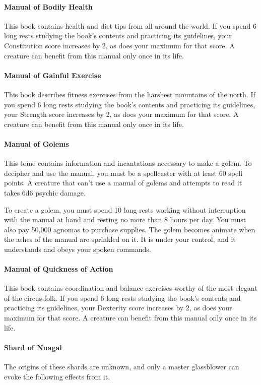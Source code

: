     \paragraph{Manual of Bodily Health}
        This book contains health and diet tips from all around the world.
        If you spend 6 long rests studying the book's contents and practicing its guidelines, your Constitution score increases by 2, as does your maximum for that score.
        A creature can benefit from this manual only once in its life.
    \paragraph{Manual of Gainful Exercise}
        This book describes fitness exercises from the harshest mountains of the north.
        If you spend 6 long rests studying the book's contents and practicing its guidelines, your Strength score increases by 2, as does your maximum for that score.
        A creature can benefit from this manual only once in its life.
    \paragraph{Manual of Golems}
        This tome contains information and incantations necessary to make a golem.
        To decipher and use the manual, you must be a spellcaster with at least 60 spell points.
        A creature that can't use a manual of golems and attempts to read it takes 6d6 psychic damage.

        To create a golem, you must spend 10 long rests working without interruption with the manual at hand and resting no more than 8 hours per day.
        You must also pay 50,000 agnomas to purchase supplies.
        The golem becomes animate when the ashes of the manual are sprinkled on it.
        It is under your control, and it understands and obeys your spoken commands.
    \paragraph{Manual of Quickness of Action}
        This book contains coordination and balance exercises worthy of the most elegant of the circus-folk.
        If you spend 6 long rests studying the book's contents and practicing its guidelines, your Dexterity score increases by 2, as does your maximum for that score.
        A creature can benefit from this manual only once in its life.
    \paragraph{Shard of Nuagal}
        The origins of these shards are unknown, and only a master glassblower can evoke the following effects from it.

